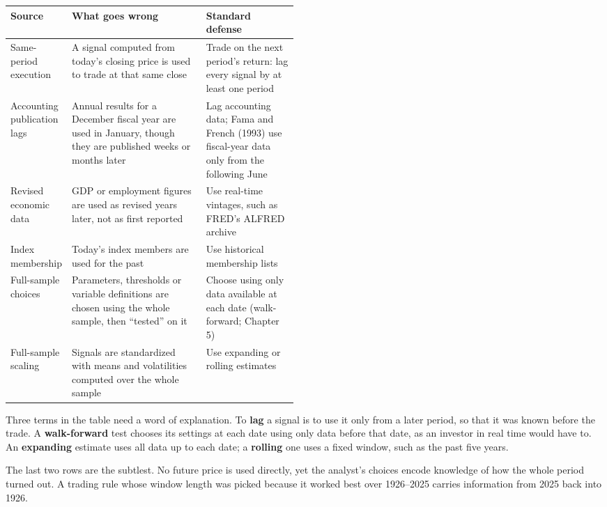 \begin{center}
\small
\begin{tabularx}{0.9\linewidth}{@{}>{\raggedright\arraybackslash}p{0.16\linewidth}>{\raggedright\arraybackslash}X>{\raggedright\arraybackslash}p{0.32\linewidth}@{}}
\toprule
Source & What goes wrong & Standard defense \\
\midrule
Same-period execution & A signal computed from today's closing price is used to trade at that same close & Trade on the next period's return: lag every signal by at least one period \\
Accounting publication lags & Annual results for a December fiscal year are used in January, though they are published weeks or months later & Lag accounting data; Fama and French (1993) use fiscal-year data only from the following June \\
Revised economic data & GDP or employment figures are used as revised years later, not as first reported & Use real-time vintages, such as FRED's ALFRED archive \\
Index membership & Today's index members are used for the past & Use historical membership lists \\
Full-sample choices & Parameters, thresholds or variable definitions are chosen using the whole sample, then ``tested'' on it & Choose using only data available at each date (walk-forward; Chapter 5) \\
Full-sample scaling & Signals are standardized with means and volatilities computed over the whole sample & Use expanding or rolling estimates \\
\bottomrule
\end{tabularx}
\end{center}

Three terms in the table need a word of explanation. To \textbf{lag} a signal is to use it only from a later period, so that it was known before the trade. A \textbf{walk-forward} test chooses its settings at each date using only data before that date, as an investor in real time would have to. An \textbf{expanding} estimate uses all data up to each date; a \textbf{rolling} one uses a fixed window, such as the past five years.

The last two rows are the subtlest. No future price is used directly, yet the analyst's choices encode knowledge of how the whole period turned out. A trading rule whose window length was picked because it worked best over 1926--2025 carries information from 2025 back into 1926.

